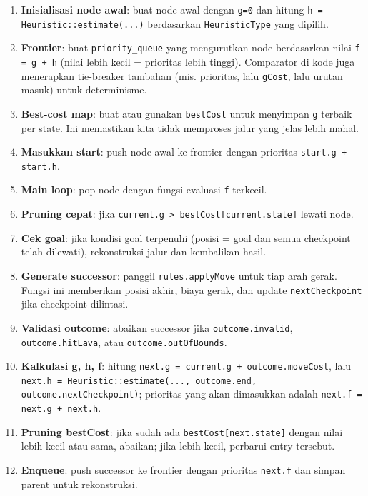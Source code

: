 \begin{enumerate}
    \item \textbf{Inisialisasi node awal}: buat node awal dengan \texttt{g=0} dan hitung \texttt{h = Heuristic::estimate(...)} berdasarkan \texttt{HeuristicType} yang dipilih.
    \item \textbf{Frontier}: buat \texttt{priority\_queue} yang mengurutkan node berdasarkan nilai \texttt{f = g + h} (nilai lebih kecil = prioritas lebih tinggi). Comparator di kode juga menerapkan tie-breaker tambahan (mis. prioritas, lalu \texttt{gCost}, lalu urutan masuk) untuk determinisme.
    \item \textbf{Best-cost map}: buat atau gunakan \texttt{bestCost} untuk menyimpan \texttt{g} terbaik per state. Ini memastikan kita tidak memproses jalur yang jelas lebih mahal.
    \item \textbf{Masukkan start}: push node awal ke frontier dengan prioritas \texttt{start.g + start.h}.
    \item \textbf{Main loop}: pop node dengan fungsi evaluasi \texttt{f} terkecil.
    \item \textbf{Pruning cepat}: jika \texttt{current.g > bestCost[current.state]} lewati node.
    \item \textbf{Cek goal}: jika kondisi goal terpenuhi (posisi = goal dan semua checkpoint telah dilewati), rekonstruksi jalur dan kembalikan hasil.
    \item \textbf{Generate successor}: panggil \texttt{rules.applyMove} untuk tiap arah gerak. Fungsi ini memberikan posisi akhir, biaya gerak, dan update \texttt{nextCheckpoint} jika checkpoint dilintasi.
    \item \textbf{Validasi outcome}: abaikan successor jika \texttt{outcome.invalid}, \texttt{outcome.hitLava}, atau \texttt{outcome.outOfBounds}.
    \item \textbf{Kalkulasi g, h, f}: hitung \texttt{next.g = current.g + outcome.moveCost}, lalu \texttt{next.h = Heuristic::estimate(..., outcome.end, outcome.nextCheckpoint)}; prioritas yang akan dimasukkan adalah \texttt{next.f = next.g + next.h}.
    \item \textbf{Pruning bestCost}: jika sudah ada \texttt{bestCost[next.state]} dengan nilai lebih kecil atau sama, abaikan; jika lebih kecil, perbarui entry tersebut.
    \item \textbf{Enqueue}: push successor ke frontier dengan prioritas \texttt{next.f} dan simpan parent untuk rekonstruksi.
\end{enumerate}

